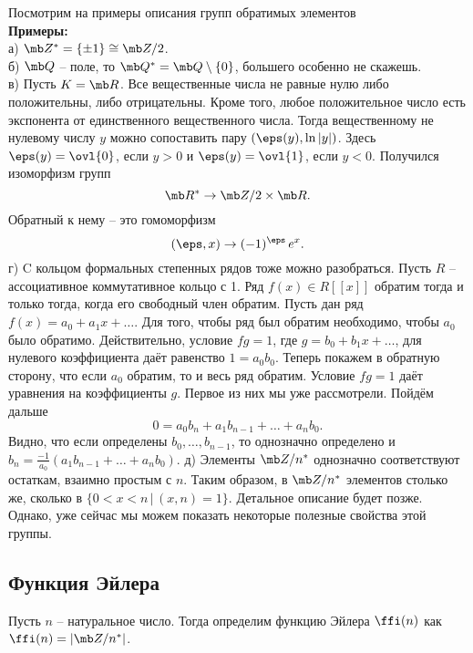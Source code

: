 \noindent Посмотрим на примеры описания групп обратимых элементов\\
{\bf Примеры:}\\
а) $\mb Z^* = \{\pm 1\}\cong \mb Z/2$.\\
б) $\mb Q$ -- поле, то $\mb Q^* = \mb Q\setminus\{0\}$, большего особенно не скажешь.\\
в) Пусть $K=\mb R$. Все вещественные числа не равные нулю либо положительны, либо отрицательны. Кроме того, любое положительное число есть экспонента от единственного вещественного числа. Тогда вещественному не нулевому числу $y$ можно сопоставить пару $(\eps(y), \ln|y|)$. Здесь $\eps(y)=\ovl{0}$, если $y>0$ и $\eps(y)=\ovl{1}$, если $y<0$. Получился изоморфизм групп $$\mb R^*\to \mb Z/2 \times \mb R.$$
Обратный к нему -- это гомоморфизм
$$(\eps,x) \to (-1)^{\eps}\, e^x.$$
\noindent г) C кольцом формальных степенных рядов тоже можно разобраться. 
\lm Пусть $R$ -- ассоциативное коммутативное кольцо с 1. Ряд $f(x) \in R[[x]]$ обратим тогда и только тогда, когда его свободный член обратим.
\elm
\proof Пусть дан ряд $f(x)=a_0+a_1x+\dots$. Для того, чтобы ряд был обратим необходимо, чтобы $a_0$ было обратимо. Действительно, условие $fg=1$, где $g=b_0+b_1x+\dots$, для нулевого коэффициента даёт равенство $1=a_0b_0$.  Теперь покажем в обратную сторону, что если $a_0$ обратим, то и весь ряд обратим. Условие $fg=1$ даёт уравнения на коэффициенты $g$. Первое из них мы уже рассмотрели. Пойдём дальше 
$$0=a_0b_n+a_1b_{n-1}+\dots+a_nb_0.$$
Видно, что если определены $b_0, \dots, b_{n-1}$, то однозначно определено и $b_n=\frac{-1}{a_0}(a_1b_{n-1}+\dots+a_nb_0)$.
\endproof
\noindent д) Элементы $\mb Z/n^*$ однозначно соответствуют остаткам, взаимно простым с $n$. Таким образом, в $\mb Z/n^*$ элементов столько же, сколько в  $\{0 < x< n\,|\, (x,n) = 1\}$. Детальное описание будет позже.\\

Однако, уже сейчас мы можем показать некоторые полезные свойства этой группы. 




\subsection{Функция Эйлера}

\dfn Пусть $n$ -- натуральное число. Тогда определим функцию Эйлера $\ffi(n)$ как $\ffi(n)=|\mb Z/n^*|$. 
\edfn 

